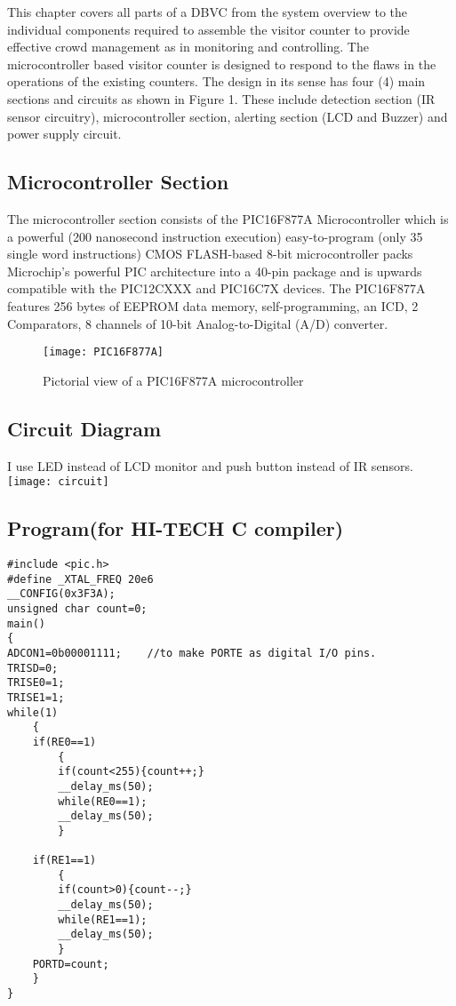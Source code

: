 \documentclass{article}
\begin{document}
\par
This chapter covers all parts of a DBVC from the system overview to the individual components required to
assemble the visitor counter to provide effective crowd management as in monitoring and controlling. The
microcontroller based visitor counter is designed to respond to the flaws in the operations of the existing
counters. The design in its sense has four (4) main sections and circuits as shown in Figure 1. These include
detection section (IR sensor circuitry), microcontroller section, alerting section (LCD and Buzzer) and power
supply circuit.

\subsection{Microcontroller Section}
The microcontroller section consists of the PIC16F877A Microcontroller which is a powerful (200 nanosecond
instruction execution) easy-to-program (only 35 single word instructions) CMOS FLASH-based 8-bit
microcontroller packs Microchip's powerful PIC architecture into a 40-pin package and is upwards compatible
with the PIC12CXXX and PIC16C7X devices. The PIC16F877A features 256 bytes of EEPROM data memory,
self-programming, an ICD, 2 Comparators, 8 channels of 10-bit Analog-to-Digital (A/D) converter.
    

\vspace{2cm}
\begin{SCfigure}[0.5][h]
\caption{Pictorial view of a PIC16F877A microcontroller}
\texttt{[image: PIC16F877A]}
\end{SCfigure}

\newpage
\subsection{Circuit Diagram}
I use LED instead of LCD monitor and  push button instead of IR sensors. 
\vspace{1.5cm}
\texttt{[image: circuit]}

\subsection{Program(for HI-TECH C compiler)}
\begin{lstlisting}
#include <pic.h>
#define _XTAL_FREQ 20e6
__CONFIG(0x3F3A);
unsigned char count=0;
main()
{
ADCON1=0b00001111;    //to make PORTE as digital I/O pins.
TRISD=0;
TRISE0=1;
TRISE1=1;
while(1)
    {
    if(RE0==1)
        {
        if(count<255){count++;}
        __delay_ms(50);
        while(RE0==1);
        __delay_ms(50);
        }
    
    if(RE1==1)
        {
        if(count>0){count--;}
        __delay_ms(50); 
        while(RE1==1);
        __delay_ms(50);
        }
    PORTD=count;
    }
}
\end{lstlisting}
\end{document}
